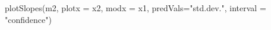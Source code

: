 \begin{Schunk}
\begin{Sinput}
 plotSlopes(m2, plotx = x2, modx = x1, predVals="std.dev.", interval = "confidence")
\end{Sinput}
\end{Schunk}
